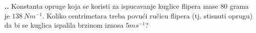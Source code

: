 
\noindent 
\textbf{
\thecjelina.\thezadatak.}
Konstanta opruge koja se koristi za ispucavanje kuglice flipera mase $80$ grama je $138\ Nm^{-1}$.
Koliko centrimetara treba povući ručicu flipera (tj. stisnuti oprugu) da bi se kuglica ispalila brzinom iznosa $5 ms^{-1}$?

